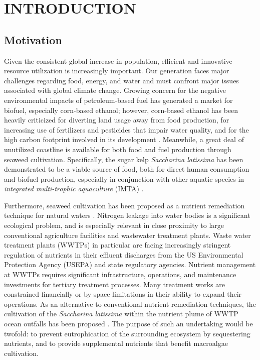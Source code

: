 \chapter{INTRODUCTION} \label{ch:intro}

\section{Motivation}
  Given the consistent global increase in population, efficient and innovative resource utilization is increasingly important.
Our generation faces major challenges regarding food, energy, and water and must confront major issues associated with global climate change.
Growing concern for the negative environmental impacts of petroleum-based fuel has generated a market for biofuel, especially corn-based ethanol;
however, corn-based ethanol has been heavily criticized for diverting land usage away from food production, for increasing use of fertilizers and pesticides that impair water quality, and for the high carbon footprint involved in its development \cite{jones_corn-based_2015}.
Meanwhile, a great deal of unutilized coastline is available for both food and fuel production through seaweed cultivation.
Specifically, the sugar kelp \textit{Saccharina latissima} has been demonstrated to be a viable source of food, both for direct human consumption and biofuel production, especially in conjunction with other aquatic species in \textit{integrated multi-trophic aquaculture} (IMTA) \cite{brzeski_integrated_1996,chopin_integrating_2001,hadley_modeling_2015,handa_seasonal_2013}.

Furthermore, seaweed cultivation has been proposed as a nutrient remediation technique for natural waters \cite{kim_field_2014}.
Nitrogen leakage into water bodies is a significant ecological problem, and is especially relevant in close proximity to large conventional agriculture facilities and wastewater treatment plants.
Waste water treatment plants (WWTPs) in particular are facing increasingly stringent regulation of nutrients in their effluent discharges from the US Environmental Protection Agency (USEPA) and state regulatory agencies.
Nutrient management at WWTPs requires significant infrastructure, operations, and maintenance investments for tertiary treatment processes. Many treatment works are constrained financially or by space limitations in their ability to expand their operations.
As an alternative to conventional nutrient remediation techniques, the cultivation of the \textit{Saccharina latissima} within the nutrient plume of WWTP ocean outfalls has been proposed \cite{yang_kelp_2015}.
The purpose of such an undertaking would be twofold: to prevent eutrophication of the surrounding ecosystem by sequestering nutrients, and to provide supplemental nutrients that benefit macroalgae cultivation.

